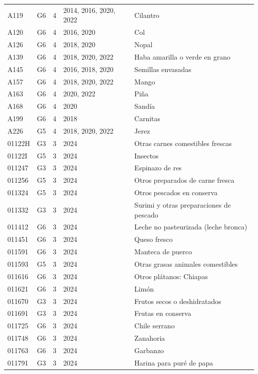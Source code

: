 \begin{table}[ht]
\begin{tabular}{llrll}
  A119 & G6 &   4 & 2014, 2016, 2020, 2022 & Cilantro \\ 
  A120 & G6 &   4 & 2016, 2020 & Col \\ 
  A126 & G6 &   4 & 2018, 2020 & Nopal \\ 
  A139 & G6 &   4 & 2018, 2020, 2022 & Haba amarilla o verde en grano \\ 
  A145 & G6 &   4 & 2016, 2018, 2020 & Semillas envasadas \\ 
  A157 & G6 &   4 & 2018, 2020, 2022 & Mango \\ 
  A163 & G6 &   4 & 2020, 2022 & Piña \\ 
  A168 & G6 &   4 & 2020 & Sandía \\ 
  A199 & G6 &   4 & 2018 & Carnitas \\ 
  A226 & G5 &   4 & 2018, 2020, 2022 & Jerez \\ 
  01122H & G3 &   3 & 2024 & Otras carnes comestibles frescas \\ 
  01122I & G5 &   3 & 2024 & Insectos \\ 
  011247 & G3 &   3 & 2024 & Espinazo de res \\ 
  011256 & G5 &   3 & 2024 & Otros preparados de carne fresca \\ 
  011324 & G5 &   3 & 2024 & Otros pescados en conserva \\ 
  011332 & G3 &   3 & 2024 & Surimi y otras preparaciones de pescado \\ 
  011412 & G6 &   3 & 2024 & Leche no pasteurizada (leche bronca) \\ 
  011451 & G6 &   3 & 2024 & Queso fresco \\ 
  011591 & G6 &   3 & 2024 & Manteca de puerco \\ 
  011593 & G5 &   3 & 2024 & Otras grasas animales comestibles \\ 
  011616 & G6 &   3 & 2024 & Otros plátanos: Chiapas \\ 
  011621 & G6 &   3 & 2024 & Limón \\ 
  011670 & G3 &   3 & 2024 & Frutos secos o deshidratados \\ 
  011691 & G3 &   3 & 2024 & Frutas en conserva \\ 
  011725 & G6 &   3 & 2024 & Chile serrano \\ 
  011748 & G6 &   3 & 2024 & Zanahoria \\ 
  011763 & G6 &   3 & 2024 & Garbanzo \\ 
  011791 & G3 &   3 & 2024 & Harina para puré de papa \\ 

\end{tabular}
\end{table}
